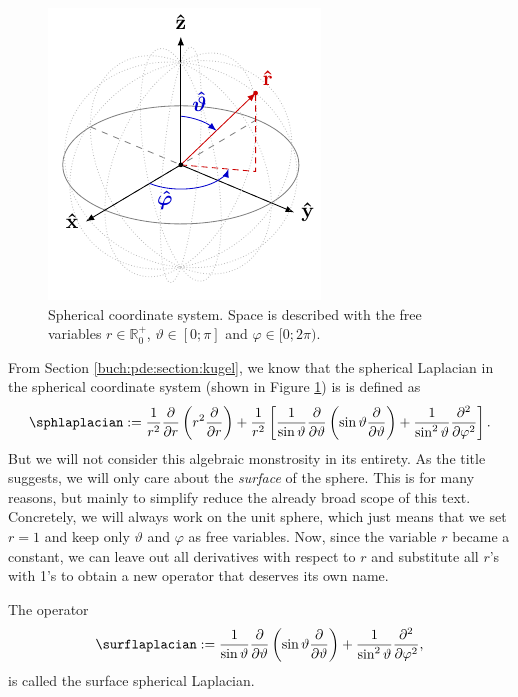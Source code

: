 \begin{figure}
  \centering
  \includegraphics{papers/kugel/figures/tikz/spherical-coordinates}
  \caption{
    Spherical coordinate system. Space is described with the free variables $r
    \in \mathbb{R}_0^+$, $\vartheta \in [0; \pi]$ and $\varphi \in [0; 2\pi)$.
    \label{kugel:fig:spherical-coordinates}
  }
\end{figure}

From Section \ref{buch:pde:section:kugel}, we know that the spherical Laplacian
in the spherical coordinate system (shown in Figure
\ref{kugel:fig:spherical-coordinates}) is is defined as
\begin{equation*}
    \sphlaplacian :=
      \frac{1}{r^2} \frac{\partial}{\partial r} \left(
        r^2 \frac{\partial}{\partial r}
      \right)
      + \frac{1}{r^2} \left[
          \frac{1}{\sin\vartheta} \frac{\partial}{\partial \vartheta} \left(
            \sin\vartheta \frac{\partial}{\partial\vartheta}
          \right)
        + \frac{1}{\sin^2 \vartheta} \frac{\partial^2}{\partial\varphi^2}
      \right].
\end{equation*}
But we will not consider this algebraic monstrosity in its entirety. As the
title suggests, we will only care about the \emph{surface} of the sphere.  This
is for many reasons, but mainly to simplify reduce the already broad scope of
this text. Concretely, we will always work on the unit sphere, which just means
that we set $r = 1$ and keep only $\vartheta$ and $\varphi$ as free variables.
Now, since the variable $r$ became a constant, we can leave out all derivatives
with respect to $r$ and substitute all $r$'s with 1's to obtain a new operator
that deserves its own name.

\begin{definition}
  \label{kugel:def:surface-laplacian}
  The operator
  \begin{equation*}
      \surflaplacian :=
        \frac{1}{\sin\vartheta} \frac{\partial}{\partial \vartheta} \left(
          \sin\vartheta \frac{\partial}{\partial\vartheta}
        \right)
        + \frac{1}{\sin^2 \vartheta} \frac{\partial^2}{\partial\varphi^2},
  \end{equation*}
  is called the surface spherical Laplacian.
\end{definition}

